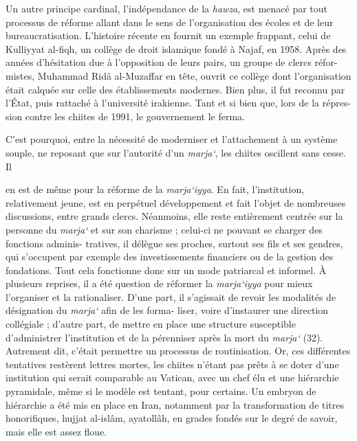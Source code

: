 Un autre principe cardinal, l'indépendance de la \emph{hawza}, est
menacé par tout processus de réforme allant dans le sens de
l'organisation des écoles et de leur bureaucratisation. L'histoire
récente en fournit un exemple frappant, celui de Kulliyyat al-fiqh, un
collège de droit islamique fondé à Najaf, en 1958. Après des années
d'hésitation due à l'opposition de leurs pairs, un groupe de clercs
réfor- mistes, Muhammad Ridâ al-Muzaffar en tête, ouvrit ce collège dont
l'organisation était calquée sur celle des établissements modernes. Bien
plus, il fut reconnu par l'État, puis rattaché à l'université irakienne.
Tant et si bien que, lors de la répres- sion contre les chiites de 1991,
le gouvernement le ferma.

C'est pourquoi, entre la nécessité de moderniser et l'attachement à un
système souple, ne reposant que sur l'autorité d'un \emph{marja`}, les
chiites oscillent sans cesse. Il

en est de même pour la réforme de la \emph{marja`iyya}. En fait,
l'institution, relativement jeune, est en perpétuel développement et
fait l'objet de nombreuses discussions, entre grands clercs. Néanmoins,
elle reste entièrement centrée sur la personne du \emph{marja`} et sur
son charisme ; celui-ci ne pouvant se charger des fonctions adminis-
tratives, il délègue ses proches, surtout ses fils et ses gendres, qui
s'occupent par exemple des investissements financiers ou de la gestion
des fondations. Tout cela fonctionne donc sur un mode patriarcal et
informel. À plusieurs reprises, il a été question de réformer la
\emph{marja`iyya} pour mieux l'organiser et la rationaliser. D'une part,
il s'agissait de revoir les modalités de désignation du \emph{marja`}
afin de les forma- liser, voire d'instaurer une direction collégiale ;
d'autre part, de mettre en place une structure susceptible d'administrer
l'institution et de la pérenniser après la mort du \emph{marja`} (32).
Autrement dit, c'était permettre un processus de routinisation. Or, ces
différentes tentatives restèrent lettres mortes, les chiites n'étant pas
prêts à se doter d'une institution qui serait comparable au Vatican,
avec un chef élu et une hiérarchie pyramidale, même si le modèle est
tentant, pour certains. Un embryon de hiérarchie a été mis en place en
Iran, notamment par la transformation de titres honorifiques, hujjat
al-islâm, ayatollâh, en grades fondés sur le degré de savoir, mais elle
est assez floue.

